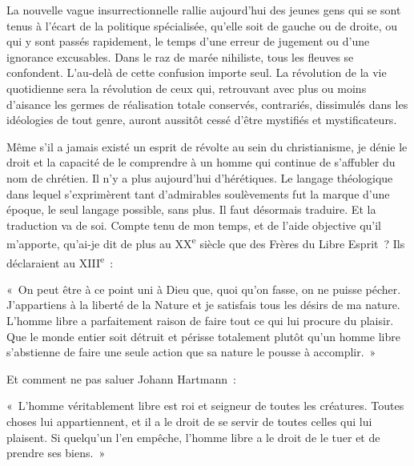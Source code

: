 \documentclass[french,twoside]{book} %
\newcommand{\astermono}{\medskip\centerline{\color{rubric}\large\selectfont{\syms ✻}}\medskip\par}%
\newenvironment{quoteblock}%
  {\begin{quoting}}
  {\end{quoting}}
\newenvironment{quotebar}{%
    \def\FrameCommand{{\color{rubric!10!}\vrule width 0.5em} \hspace{0.9em}}%
    \def\OuterFrameSep{\itemsep} %
    \MakeFramed {\advance\hsize-\width \FrameRestore}
  }%
  {%
    \endMakeFramed
  }
\renewenvironment{quoteblock}%
  {%
    \savenotes
    \setstretch{0.9}
    \normalfont
    \begin{quotebar}
  }
  {%
    \end{quotebar}
    \spewnotes
  }
\begin{document}
La nouvelle vague insurrectionnelle rallie aujourd’hui des jeunes gens qui se sont tenus à l’écart de la politique spécialisée, qu’elle soit de gauche ou de droite, ou qui y sont passés rapidement, le temps d’une erreur de jugement ou d’une ignorance excusables. Dans le raz de marée nihiliste, tous les fleuves se confondent. L’au-delà de cette confusion importe seul. La révolution de la vie quotidienne sera la révolution de ceux qui, retrouvant avec plus ou moins d’aisance les germes de réalisation totale conservés, contrariés, dissimulés dans les idéologies de tout genre, auront aussitôt cessé d’être mystifiés et mystificateurs.\par

\astermono

\noindent Même s’il a jamais existé un esprit de révolte au sein du christianisme, je dénie le droit et la capacité de le comprendre à un homme qui continue de s’affubler du nom de chrétien. Il n’y a plus aujourd’hui d’hérétiques. Le langage théologique dans lequel s’exprimèrent tant d’admirables soulèvements fut la marque d’une époque, le seul langage possible, sans plus. Il faut désormais traduire. Et la traduction va de soi. Compte tenu de mon temps, et de l’aide objective qu’il m’apporte, qu’ai-je dit de plus au XX\textsuperscript{e} siècle que des Frères du Libre Esprit ? Ils déclaraient au XIII\textsuperscript{e} :\par

\begin{quoteblock}
\noindent « On peut être à ce point uni à Dieu que, quoi qu’on fasse, on ne puisse pécher. J’appartiens à la liberté de la Nature et je satisfais tous les désirs de ma nature. L’homme libre a parfaitement raison de faire tout ce qui lui procure du plaisir. Que le monde entier soit détruit et périsse totalement plutôt qu’un homme libre s’abstienne de faire une seule action que sa nature le pousse à accomplir. »\end{quoteblock}

\noindent Et comment ne pas saluer Johann Hartmann :\par

\begin{quoteblock}
\noindent « L’homme véritablement libre est roi et seigneur de toutes les créatures. Toutes choses lui appartiennent, et il a le droit de se servir de toutes celles qui lui plaisent. Si quelqu’un l’en empêche, l’homme libre a le droit de le tuer et de prendre ses biens. »\end{quoteblock}
\end{document}
